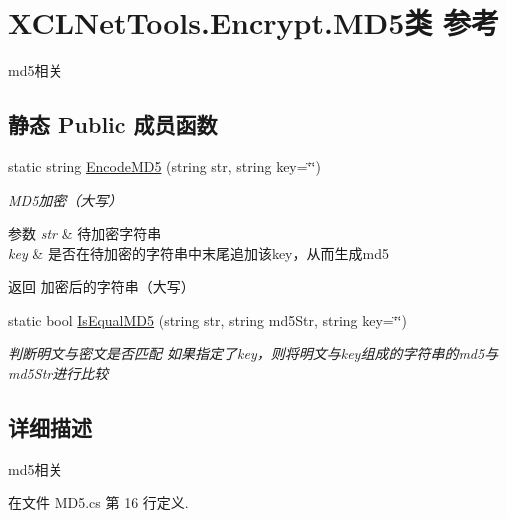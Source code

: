 \hypertarget{class_x_c_l_net_tools_1_1_encrypt_1_1_m_d5}{}\section{X\+C\+L\+Net\+Tools.\+Encrypt.\+M\+D5类 参考}
\label{class_x_c_l_net_tools_1_1_encrypt_1_1_m_d5}


md5相关  


\subsection*{静态 Public 成员函数}
\begin{DoxyCompactItemize}
\item 
static string \hyperlink{class_x_c_l_net_tools_1_1_encrypt_1_1_m_d5_a146cf118c47e0693f82119d39f4b7ef1}{Encode\+M\+D5} (string str, string key=\char`\"{}\char`\"{})
\begin{DoxyCompactList}\small\item\em M\+D5加密（大写） 
\begin{DoxyParams}{参数}
{\em str} & 待加密字符串\\
\hline
{\em key} & 是否在待加密的字符串中末尾追加该key，从而生成md5\\
\hline
\end{DoxyParams}
\begin{DoxyReturn}{返回}
加密后的字符串（大写）
\end{DoxyReturn}
\end{DoxyCompactList}\item 
static bool \hyperlink{class_x_c_l_net_tools_1_1_encrypt_1_1_m_d5_a47f3bda0226d74bd2c9823a023ed8ed5}{Is\+Equal\+M\+D5} (string str, string md5\+Str, string key=\char`\"{}\char`\"{})
\begin{DoxyCompactList}\small\item\em 判断明文与密文是否匹配 如果指定了key，则将明文与key组成的字符串的md5与md5\+Str进行比较 \end{DoxyCompactList}\end{DoxyCompactItemize}


\subsection{详细描述}
md5相关 



在文件 M\+D5.\+cs 第 16 行定义.



